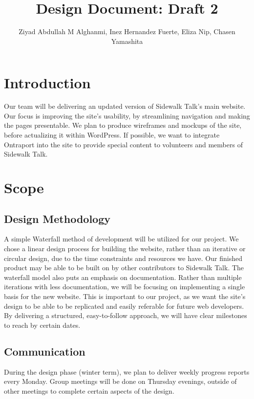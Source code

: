 \documentclass[10pt, a4paper, technote, draftclsnofoot,onecolumn ]{IEEEtran}
\title{\huge Design Document: Draft 2}
\author{Ziyad Abdullah M Alghanmi, Inez Hernandez Fuerte, Eliza Nip, Chasen Yamashita}
\begin{document}


\tableofcontents

\newpage

\section{Introduction}

Our team will be delivering an updated version of Sidewalk Talk’s main website. Our focus is improving the site’s usability, by streamlining navigation and making the pages presentable. We plan to produce wireframes and mockups of the site, before actualizing it within WordPress. If possible, we want to integrate Ontraport into the site to provide special content to volunteers and members of Sidewalk Talk. 

\section{Scope}

\subsection{Design Methodology}

A simple Waterfall method of development will be utilized for our project. We chose a linear design process for building the website, rather than an iterative or circular design, due to the time constraints and resources we have. Our finished product may be able to be built on by other contributors to Sidewalk Talk. 
The waterfall model also puts an emphasis on documentation. Rather than multiple iterations with less documentation, we will be focusing on implementing a single basis for the new website. This is important to our project, as we want the site’s design to be able to be replicated and easily referable for future web developers. By delivering a structured, easy-to-follow approach, we will have clear milestones to reach by certain dates.


\subsection{Communication}
During the design phase (winter term), we plan to deliver weekly progress reports every Monday. Group meetings will be done on Thursday evenings, outside of other meetings to complete certain aspects of the design.
\end{document}
